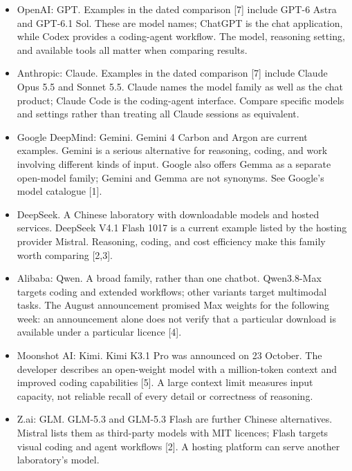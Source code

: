 \begin{itemize}
\item OpenAI: GPT.
Examples in the dated comparison [7]
include GPT-6 Astra and GPT-6.1 Sol.
These are model names; ChatGPT is the
chat application, while Codex provides
a coding-agent workflow. The model,
reasoning setting, and available tools
all matter when comparing results.

\item Anthropic: Claude.
Examples in the dated comparison [7]
include Claude Opus 5.5 and Sonnet 5.5.
Claude names the model family as well
as the chat product; Claude Code is
the coding-agent interface. Compare
specific models and settings rather
than treating all Claude sessions as
equivalent.

\item Google DeepMind: Gemini.
Gemini 4 Carbon and Argon are current
examples. Gemini is a serious alternative
for reasoning, coding, and work involving
different kinds of input. Google also
offers Gemma as a separate open-model
family; Gemini and Gemma are not synonyms.
See Google's model catalogue [1].

\item DeepSeek.
A Chinese laboratory with downloadable
models and hosted services. DeepSeek
V4.1 Flash 1017 is a current example
listed by the hosting provider Mistral.
Reasoning, coding, and cost efficiency
make this family worth comparing [2,3].

\item Alibaba: Qwen.
A broad family, rather than one chatbot.
Qwen3.8-Max targets coding and extended
workflows; other variants target
multimodal tasks. The August announcement
promised Max weights for the following
week: an announcement alone does not
verify that a particular download is
available under a particular licence [4].

\item Moonshot AI: Kimi.
Kimi K3.1 Pro was announced on 23 October.
The developer describes an open-weight
model with a million-token context and
improved coding capabilities [5].
A large context limit measures input
capacity, not reliable recall of every
detail or correctness of reasoning.

\item Z.ai: GLM.
GLM-5.3 and GLM-5.3 Flash are further
Chinese alternatives. Mistral lists them
as third-party models with MIT licences;
Flash targets visual coding and agent
workflows [2]. A hosting platform can
serve another laboratory's model.


\end{itemize}
